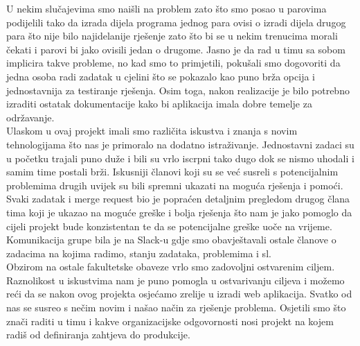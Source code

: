 		U nekim slučajevima smo naišli na problem zato što smo posao u parovima podijelili tako da izrada dijela programa jednog para ovisi o izradi dijela drugog para što 
		nije bilo najidelanije rješenje zato što bi se u nekim trenucima morali čekati i parovi bi jako ovisili jedan o drugome. Jasno je da rad u timu 
		sa sobom implicira takve probleme, no kad smo to primjetili, pokušali smo dogovoriti da jedna osoba radi zadatak u cjelini što se pokazalo kao puno 
		brža opcija i jednostavnija za testiranje rješenja. Osim toga, nakon realizacije je bilo potrebno izraditi ostatak dokumentacije kako bi aplikacija 
		imala dobre temelje za održavanje.\\
		\noindent Ulaskom u ovaj projekt imali smo različita iskustva i znanja s novim tehnologijama što nas je primoralo na 
		dodatno istraživanje. Jednostavni zadaci su u početku trajali puno duže i bili su vrlo iscrpni tako dugo dok se nismo uhodali i samim time postali brži. 
		Iskusniji članovi koji su se već susreli s potencijalnim problemima drugih uvijek su bili spremni ukazati na moguća rješenja i pomoći.\\
		\noindent Svaki zadatak i merge request bio je popraćen detaljnim pregledom drugog člana tima koji je ukazao na moguće greške i bolja rješenja što nam je 
		jako pomoglo da cijeli projekt bude konzistentan te da se potencijalne greške uoče na vrijeme.\\
		\noindent Komunikacija grupe bila je na Slack-u gdje smo obavještavali ostale članove o zadacima na kojima radimo, stanju zadataka, problemima i sl.\\
		\noindent Obzirom na ostale fakultetske obaveze vrlo smo zadovoljni ostvarenim ciljem. Raznolikost u iskustvima nam je puno pomogla u ostvarivanju ciljeva i 
		možemo reći da se nakon ovog projekta osjećamo zrelije u izradi web aplikacija. Svatko od nas se susreo s nečim novim i našao način za rješenje problema. 
		Osjetili smo što znači raditi u timu i kakve organizacijske odgovornosti nosi projekt na kojem radiš od definiranja zahtjeva do produkcije.\\
		\eject 